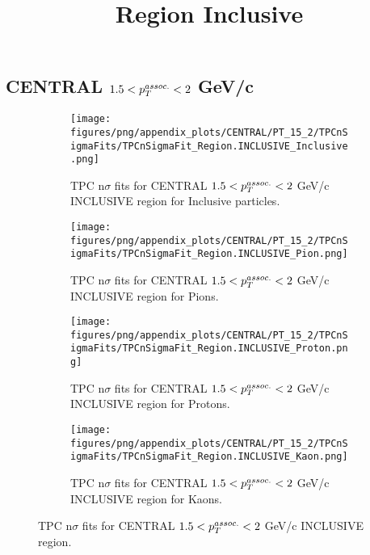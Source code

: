     
            \subsection{CENTRAL $1.5 < \pTassoc < 2$ GeV/c}
            \begin{figure}[H]
                \title{Region Inclusive}
                \begin{subfigure}[b]{0.5\textwidth}
                    \centering
                    \texttt{[image: figures/png/appendix\_plots/CENTRAL/PT\_15\_2/TPCnSigmaFits/TPCnSigmaFit\_Region.INCLUSIVE\_Inclusive.png]}
                    \caption{TPC n$\sigma$ fits for CENTRAL $1.5 < \pTassoc < 2$ GeV/c INCLUSIVE region for Inclusive particles.}
                    \label{fig:appendix_CENTRAL_$1.5 < \pTassoc < 2$ GeV/c_INCLUSIVE_Inclusive}
                \end{subfigure}
                \begin{subfigure}[b]{0.5\textwidth}
                    \centering
                    \texttt{[image: figures/png/appendix\_plots/CENTRAL/PT\_15\_2/TPCnSigmaFits/TPCnSigmaFit\_Region.INCLUSIVE\_Pion.png]}
                    \caption{TPC n$\sigma$ fits for CENTRAL $1.5 < \pTassoc < 2$ GeV/c INCLUSIVE region for Pions.}
                    \label{fig:appendix_CENTRAL_$1.5 < \pTassoc < 2$ GeV/c_INCLUSIVE_Pion}
                \end{subfigure}
                \begin{subfigure}[b]{0.5\textwidth}
                    \centering
                    \texttt{[image: figures/png/appendix\_plots/CENTRAL/PT\_15\_2/TPCnSigmaFits/TPCnSigmaFit\_Region.INCLUSIVE\_Proton.png]}
                    \caption{TPC n$\sigma$ fits for CENTRAL $1.5 < \pTassoc < 2$ GeV/c INCLUSIVE region for Protons.}
                    \label{fig:appendix_CENTRAL_$1.5 < \pTassoc < 2$ GeV/c_INCLUSIVE_Proton}
                \end{subfigure}
                \begin{subfigure}[b]{0.5\textwidth}
                    \centering
                    \texttt{[image: figures/png/appendix\_plots/CENTRAL/PT\_15\_2/TPCnSigmaFits/TPCnSigmaFit\_Region.INCLUSIVE\_Kaon.png]}
                    \caption{TPC n$\sigma$ fits for CENTRAL $1.5 < \pTassoc < 2$ GeV/c INCLUSIVE region for Kaons.}
                    \label{fig:appendix_CENTRAL_$1.5 < \pTassoc < 2$ GeV/c_INCLUSIVE_Kaon}
                \end{subfigure}
                \caption{TPC n$\sigma$ fits for CENTRAL $1.5 < \pTassoc < 2$ GeV/c INCLUSIVE region.}
                \label{fig:appendix_CENTRAL_$1.5 < \pTassoc < 2$ GeV/c_INCLUSIVE}
            \end{figure}
